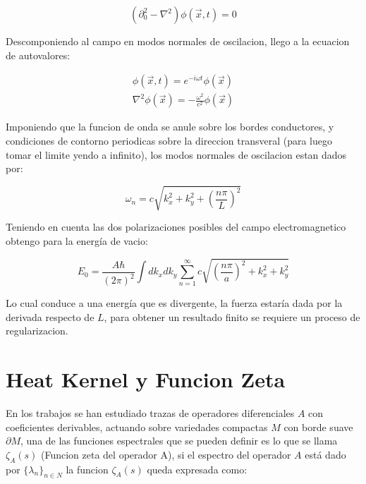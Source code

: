 \begin{equation}
( \partial _0 ^2 - \nabla  ^2  ) \phi (\vec{x} ,t) = 0 
\end{equation}

Descomponiendo al campo en modos normales de oscilacion, llego a la ecuacion de autovalores:

\begin{equation}
\begin{array}{c}
\phi ( \vec{x},t) = e ^{-i \omega t} \phi ( \vec{x}) \\
\nabla ^2 \phi ( \vec{x}) = - \frac{\omega ^2}{c ^2} \phi ( \vec{x})
\end{array}
\end{equation}

Imponiendo que la funcion de onda se anule sobre los bordes conductores, y condiciones de contorno periodicas sobre la direccion transveral (para luego tomar el limite yendo a infinito), los modos normales de oscilacion estan dados por:

\begin{equation}
\omega _n = c \sqrt{ k _x ^2 + k _y ^2 + \left( \frac{n \pi}{L} \right) ^2 }
\end{equation}

Teniendo en cuenta las dos polarizaciones posibles del campo electromagnetico obtengo para la energía de vacio:

\begin{equation}
E _0 = \frac{A \hbar }{(2 \pi) ^2} \int dk _x dk _y 
\sum _{n=1} ^{\infty} 
c
\sqrt{
		\left( \frac{n \pi}{a } \right) ^2 + k _x ^2 + k _y ^2
		}
\end{equation}


Lo cual conduce a una energía que es divergente, la fuerza estaría dada por la derivada respecto de $L$, para obtener un resultado finito se requiere un proceso de regularizacion.

\section{Heat Kernel y Funcion Zeta}


En los trabajos \cite{ Seeley:1967ea,10.2307/2373309,10.2307/2373312} se han estudiado trazas de operadores diferenciales $A$ con coeficientes derivables, actuando sobre variedades compactas $M$ con borde suave $\partial M$, una de las funciones espectrales que se pueden definir es lo que se llama $\zeta _A (s)$ (Funcion zeta del operador A), si el espectro del operador $A$ está dado por $ \{ \lambda _n \} _{n \in N}$ la funcion $\zeta _A (s)$ queda expresada como:


